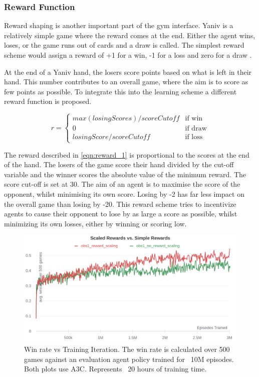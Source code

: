\documentclass[../main.tex]{subfiles}
\begin{document}
\subsubsection{Reward Function}

Reward shaping is another important part of the gym interface. Yaniv is a relatively simple game where the reward comes at the end. Either the agent wins, loses, or the game runs out of cards and a draw is called. The simplest reward scheme would assign a reward of +1 for a win, -1 for a loss and zero for a draw \cite{warchalski_deep_2020}.

At the end of a Yaniv hand, the losers score points based on what is left in their hand. This number contributes to an overall game, where the aim is to score as few points as possible. To integrate this into the learning scheme a different reward function is proposed. 

\begin{equation}
r = \begin{cases}
    max(losingScores) / scoreCutoff & \text{if win} \\
                                   0 & \text{if draw} \\
    losingScore / scoreCutoff   & \text{if loss}
    \end{cases}
\label{eqn:reward_1}
\end{equation}

The reward described in \eqref{eqn:reward_1} is proportional to the scores at the end of the hand. The losers of the game score their hand divided by the cut-off variable and the winner scores the absolute value of the minimum reward. The score cut-off is set at 30. The aim of an agent is to maximise the score of the opponent, whilst minimising its own score. Losing by -2 has far less impact on the overall game than losing by -20. This reward scheme tries to incentivize agents to cause their opponent to lose by as large a score as possible, whilst minimizing its own losses, either by winning or scoring low.

\begin{figure}
    \centering
    \includegraphics[width=\textwidth,keepaspectratio]{images/method/obs1_reward_scaling_comp.png}
    \caption{Win rate vs Training Iteration. The win rate is calculated over 500 games against an evaluation agent policy trained for ~10M episodes. Both plots use A3C. Represents ~20 hours of training time.}
    \label{fig:reward_scheme_comp}
\end{figure}
\end{document}
